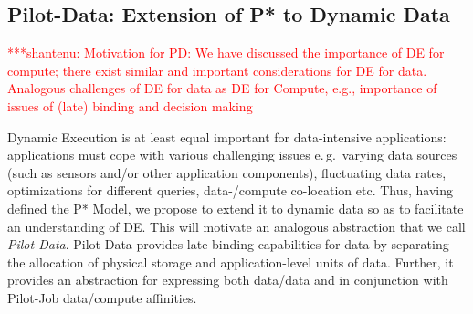\documentclass[conference,final]{IEEEtran}
\newcommand{\jhanote}[1]{ {\textcolor{red} { ***shantenu: #1 }}}
\newcommand{\jhanote}[1]{}
\begin{document}
\subsection{Pilot-Data: Extension of P* to Dynamic Data}
\label{sec:pilot-data}







\jhanote{Motivation for PD: We have discussed the importance of DE for
  compute; there exist similar and important considerations for DE for
  data. Analogous challenges of DE for data as DE for Compute, e.g.,
  importance of issues of (late) binding and decision making} 

Dynamic Execution is at least equal important for data-intensive applications:
applications must cope with various challenging issues e.\,g.\ varying data
sources (such as sensors and/or other application components), fluctuating data
rates, optimizations for different queries, data-/compute co-location etc. Thus,
having defined the P* Model, we propose to extend it to dynamic data so as to
facilitate an understanding of DE. This will motivate an analogous abstraction
that we call \emph{Pilot-Data}. Pilot-Data provides late-binding capabilities
for data by separating the allocation of physical storage and application-level
units of data. Further, it provides an abstraction for expressing both data/data and in conjunction with Pilot-Job data/compute affinities.
\end{document}

